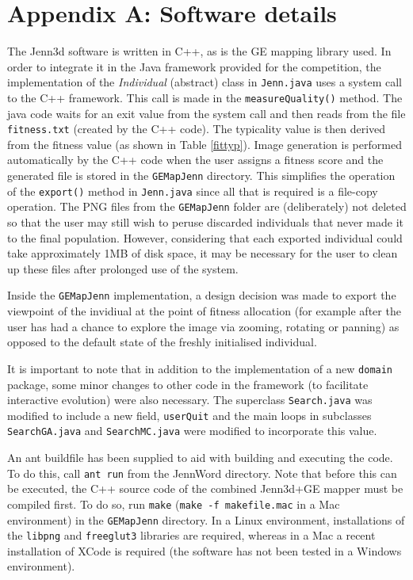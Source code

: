 \documentclass{article}
\begin{document}



\section*{Appendix A: Software details}

The Jenn3d software is written in C++, as is the GE mapping library used. In
order to integrate it in the Java framework provided for the competition, the
implementation of the \textit{Individual} (abstract) class in \texttt{Jenn.java} uses 
a system call to the C++ framework. This call is made in the \texttt{measureQuality()} 
method. The java code waits for an exit value from the system call and then reads 
from the file \texttt{fitness.txt} (created by the C++ code). The typicality value is then 
derived from the fitness value (as shown in Table \ref{fittyp}). Image generation is 
performed automatically by the C++ code when the user assigns a fitness score and the generated
file is stored in the \texttt{GEMapJenn} directory. This simplifies the operation of the
\texttt{export()} method in \texttt{Jenn.java} since all that is required is a file-copy
operation. The PNG files from the \texttt{GEMapJenn} folder are (deliberately) not deleted so 
that the user may still wish to peruse discarded individuals that never made it to the final population.
However, considering that each exported individual could take approximately 1MB of disk space, it 
may be necessary for the user to clean up these files after prolonged use of the system.

Inside the \texttt{GEMapJenn} implementation, a design decision was made to export the viewpoint of
the invidiual at the point of fitness allocation (for example after the user has had a chance to 
explore the image via zooming, rotating or panning) as opposed to the default state of the freshly
initialised individual.

It is important to note that in addition to the implementation of a new \texttt{domain} 
package, some minor changes to other code in the framework (to facilitate interactive evolution)
were also necessary. The superclass \texttt{Search.java} was modified to include a new field, 
\texttt{userQuit} and the main loops in subclasses \texttt{SearchGA.java} and \texttt{SearchMC.java} 
were modified to incorporate this value.

An ant buildfile has been supplied to aid with building and executing the code. To do this, call 
\texttt{ant run} from the JennWord directory. Note that before this can be executed, the 
C++ source code of the combined Jenn3d+GE mapper must be compiled first. To do
so, run \texttt{make} (\texttt{make -f makefile.mac} in a Mac environment) in
the \texttt{GEMapJenn} directory. In a Linux environment, installations of
the \texttt{libpng} and \texttt{freeglut3} libraries are required, whereas in a Mac 
a recent installation of XCode is required (the software has not been tested in a 
Windows environment).
\end{document}
